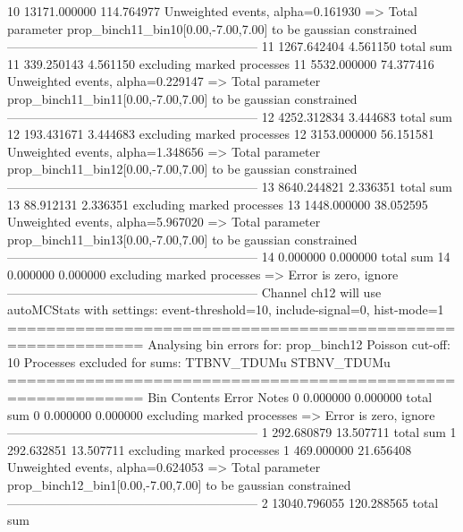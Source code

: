 10         13171.000000    114.764977      Unweighted events, alpha=0.161930
  => Total parameter prop_binch11_bin10[0.00,-7.00,7.00] to be gaussian constrained
------------------------------------------------------------
11         1267.642404     4.561150        total sum                     
11         339.250143      4.561150        excluding marked processes    
11         5532.000000     74.377416       Unweighted events, alpha=0.229147
  => Total parameter prop_binch11_bin11[0.00,-7.00,7.00] to be gaussian constrained
------------------------------------------------------------
12         4252.312834     3.444683        total sum                     
12         193.431671      3.444683        excluding marked processes    
12         3153.000000     56.151581       Unweighted events, alpha=1.348656
  => Total parameter prop_binch11_bin12[0.00,-7.00,7.00] to be gaussian constrained
------------------------------------------------------------
13         8640.244821     2.336351        total sum                     
13         88.912131       2.336351        excluding marked processes    
13         1448.000000     38.052595       Unweighted events, alpha=5.967020
  => Total parameter prop_binch11_bin13[0.00,-7.00,7.00] to be gaussian constrained
------------------------------------------------------------
14         0.000000        0.000000        total sum                     
14         0.000000        0.000000        excluding marked processes    
  => Error is zero, ignore      
------------------------------------------------------------
Channel ch12 will use autoMCStats with settings: event-threshold=10, include-signal=0, hist-mode=1
============================================================
Analysing bin errors for: prop_binch12
Poisson cut-off: 10
Processes excluded for sums: TTBNV_TDUMu STBNV_TDUMu
============================================================
Bin        Contents        Error           Notes                         
0          0.000000        0.000000        total sum                     
0          0.000000        0.000000        excluding marked processes    
  => Error is zero, ignore      
------------------------------------------------------------
1          292.680879      13.507711       total sum                     
1          292.632851      13.507711       excluding marked processes    
1          469.000000      21.656408       Unweighted events, alpha=0.624053
  => Total parameter prop_binch12_bin1[0.00,-7.00,7.00] to be gaussian constrained
------------------------------------------------------------
2          13040.796055    120.288565      total sum                     

